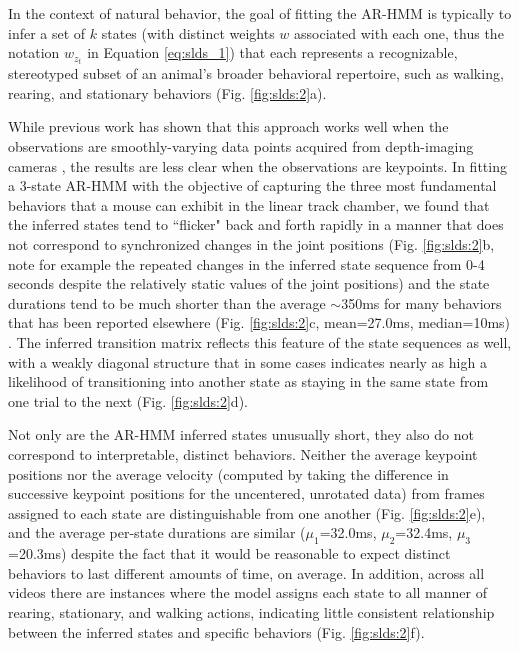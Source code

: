 In the context of natural behavior, the goal of fitting the AR-HMM is typically to infer a set of $k$ states (with distinct weights $w$ associated with each one, thus the notation $w_{z_t}$ in Equation \ref{eq:slds_1}) that each represents a recognizable, stereotyped subset of an animal's broader behavioral repertoire, such as walking, rearing, and stationary behaviors (Fig. \ref{fig:slds:2}a).

While previous work has shown that this approach works well when the observations are smoothly-varying data points acquired from depth-imaging cameras \cite{wiltschko_mapping_2015, markowitz_striatum_2018, wiltschko_revealing_2020}, the results are less clear when the observations are keypoints. In fitting a 3-state AR-HMM with the objective of capturing the three most fundamental behaviors that a mouse can exhibit in the linear track chamber, we found that the inferred states tend to ``flicker" back and forth rapidly in a manner that does not correspond to synchronized changes in the joint positions (Fig. \ref{fig:slds:2}b, note for example the repeated changes in the inferred state sequence from 0-4 seconds despite the relatively static values of the joint positions) and the state durations tend to be much shorter than the average $\sim$350ms for many behaviors that has been reported elsewhere (Fig. \ref{fig:slds:2}c, mean=27.0ms, median=10ms) \cite{wiltschko_mapping_2015}. The inferred transition matrix reflects this feature of the state sequences as well, with a weakly diagonal structure that in some cases indicates nearly as high a likelihood of transitioning into another state as staying in the same state from one trial to the next (Fig. \ref{fig:slds:2}d). 

Not only are the AR-HMM inferred states unusually short, they also do not correspond to interpretable, distinct behaviors. Neither the average keypoint positions nor the average velocity (computed by taking the difference in successive keypoint positions for the uncentered, unrotated data) from frames assigned to each state are distinguishable from one another (Fig. \ref{fig:slds:2}e), and the average per-state durations are similar ($\mu_1$=32.0ms, $\mu_2$=32.4ms, $\mu_3$=20.3ms) despite the fact that it would be reasonable to expect distinct behaviors to last different amounts of time, on average. In addition, across all videos there are instances where the model assigns each state to all manner of rearing, stationary, and walking actions, indicating little consistent relationship between the inferred states and specific behaviors (Fig. \ref{fig:slds:2}f). 


